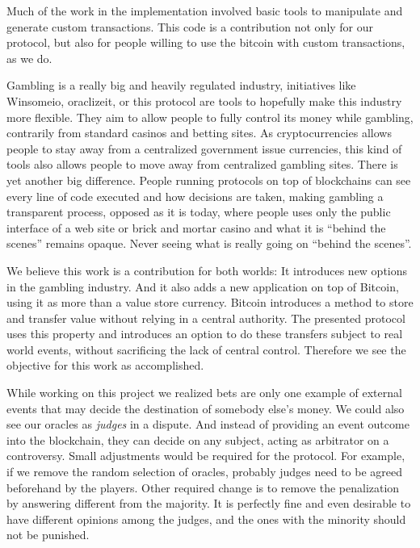 Much of the work in the implementation involved basic tools to manipulate and
  generate custom transactions.
This code is a contribution not only for our protocol, but also for people
  willing to use the bitcoin with custom transactions, as we do.

Gambling is a really big and heavily regulated industry, initiatives like
  Winsomeio, oraclizeit, or this protocol are tools to hopefully  make this
  industry more flexible.
They aim to allow people to fully control its money while gambling, contrarily
  from standard casinos and betting sites.
As cryptocurrencies allows people to stay away from a centralized government
  issue currencies, this kind of tools also allows people to move away from
  centralized gambling sites.
There is yet another big difference.
People running protocols on top of blockchains can see every line of code
  executed and how decisions are taken, making gambling a transparent process,
  opposed as it is today, where people uses only the public interface of a web
  site or brick and mortar casino and what it is ``behind the scenes'' remains
  opaque.
Never seeing what is really going on ``behind the scenes''.

We believe this work is a contribution for both worlds: It introduces new
  options in the gambling industry. And it also adds a new application on top of
  Bitcoin, using it as more than a value store currency.
Bitcoin introduces a method to store and transfer value without relying in a
  central authority.
The presented protocol uses this property and introduces an option to do
  these transfers subject to real world events, without sacrificing the lack
  of central control.
Therefore we see the objective for this work as accomplished.

While working on this project we realized bets are only one example of external
  events that may decide the destination of somebody else's money.
We could also see our oracles as \textit{judges} in a dispute.
And instead of providing an event outcome into the blockchain, they can
  decide on any subject, acting as arbitrator on a controversy.
Small adjustments would be required for the protocol.
For example, if we remove the random selection of oracles, probably judges need
  to be agreed beforehand by the players.
Other required change is to remove the penalization by answering different
  from the majority.
It is perfectly fine and even desirable to have different opinions among the
  judges, and the ones with the minority should not be punished.


